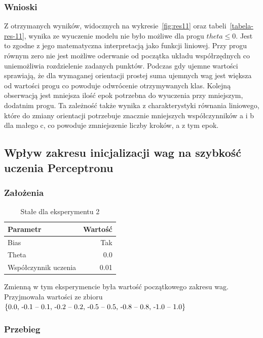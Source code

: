 \documentclass{article}
\begin{document}
\subsubsection*{Wnioski}

Z otrzymanych wyników, widocznych na wykresie~\ref{fig:res11} oraz tabeli~\ref{tabela-res-11}, wynika ze wyuczenie modelu nie było możliwe dla progu \(theta \leq  0 \). Jest to zgodne z jego matematyczna interpretacją jako funkcji liniowej. Przy progu równym zero nie jest możliwe oderwanie od początka układu współrzędnych co uniemożliwia rozdzielenie zadanych punktów. Podczas gdy ujemne wartości sprawiają, że dla wymaganej orientacji prostej suma ujemnych wag jest większa od wartości progu co powoduje odwrócenie otrzymywanych klas. Kolejną obserwacją jest mniejsza ilość epok potrzebna do wyuczenia przy mniejszym, dodatnim progu. Ta zależność także wynika z charakterystyki równania liniowego, które do zmiany orientacji potrzebuje znacznie mniejszych współczynników a i b dla małego c, co powoduje zmniejszenie liczby kroków, a z tym epok.

\newpage
\subsection{Wpływ zakresu inicjalizacji wag na szybkość uczenia Perceptronu}
\subsubsection*{Założenia}
\begin{table}[!h]
	\caption{Stałe dla eksperymentu 2}
	\label{tabela-const-2}
	\centering
	\begin{tabular}{lr}
		\toprule
		Parametr               & Wartość \\
		\midrule
		Bias                   & Tak       \\
		Theta                  & 0.0       \\
		Współczynnik uczenia & 0.01      \\
		\bottomrule
	\end{tabular}
\end{table}

Zmienną w tym eksperymencie była wartość początkowego zakresu wag. Przyjmowała wartości ze zbioru \(\{$0.0, -0.1 -- 0.1, -0.2 -- 0.2, -0.5 -- 0.5, -0.8 -- 0.8, -1.0 -- 1.0$\}\)
\subsubsection*{Przebieg}
\end{document}
